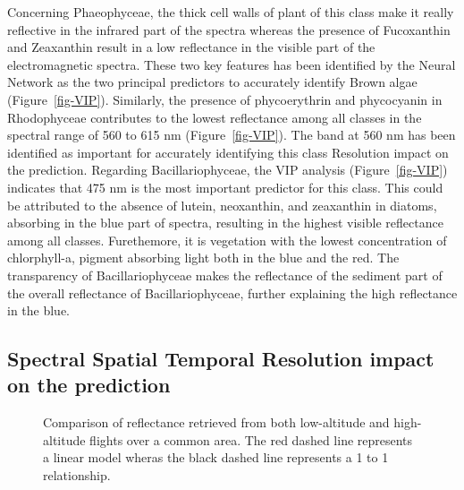 \documentclass[
  number]{elsarticle}
\begin{document}
Concerning Phaeophyceae, the thick cell walls of plant of this class
make it really reflective in the infrared part of the spectra whereas
the presence of Fucoxanthin and Zeaxanthin result in a low reflectance
in the visible part of the electromagnetic spectra. These two key
features has been identified by the Neural Network as the two principal
predictors to accurately identify Brown algae (Figure~\ref{fig-VIP}).
Similarly, the presence of phycoerythrin and phycocyanin in Rhodophyceae
contributes to the lowest reflectance among all classes in the spectral
range of 560 to 615 nm (Figure~\ref{fig-VIP}). The band at 560 nm has
been identified as important for accurately identifying this class
Resolution impact on the prediction. Regarding Bacillariophyceae, the
VIP analysis (Figure~\ref{fig-VIP}) indicates that 475 nm is the most
important predictor for this class. This could be attributed to the
absence of lutein, neoxanthin, and zeaxanthin in diatoms, absorbing in
the blue part of spectra, resulting in the highest visible reflectance
among all classes. Furethemore, it is vegetation with the lowest
concentration of chlorphyll-a, pigment absorbing light both in the blue
and the red. The transparency of Bacillariophyceae makes the reflectance
of the sediment part of the overall reflectance of Bacillariophyceae,
further explaining the high reflectance in the blue.

\subsection{Spectral Spatial Temporal Resolution impact on the
prediction}\label{spectral-spatial-temporal-resolution-impact-on-the-prediction}

\label{cell-fig-CompareRef}
\begin{figure}[H]


\caption{\label{fig-CompareRef}Comparison of reflectance retrieved from
both low-altitude and high-altitude flights over a common area. The red
dashed line represents a linear model wheras the black dashed line
represents a 1 to 1 relationship.}

\end{figure}%
\end{document}
